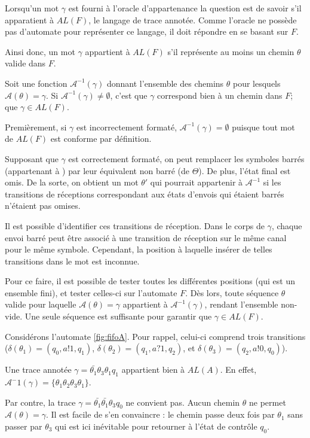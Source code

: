 Lorsqu'un mot $\gamma$ est fourni à l'oracle d'appartenance la question est de savoir s'il apparatient à $AL(F)$, le langage de trace annotée. Comme l'oracle ne possède pas d'automate pour représenter ce langage, il doit répondre en se basant sur $F$.

Ainsi donc, un mot $\gamma$ appartient à $AL(F)$ s'il représente au moins un chemin $\theta$ valide dans $F$.

Soit une fonction $\mathcal{A}^{-1}(\gamma)$ donnant l'ensemble des chemins $\theta$ pour lesquels $\mathcal{A}(\theta)=\gamma$. Si $\mathcal{A}^{-1}(\gamma)\neq\emptyset$, c'est que $\gamma$ correspond bien à un chemin dans $F$; que $\gamma\in AL(F)$.

Premièrement, si $\gamma$ est incorrectement formaté, $\mathcal{A^{-1}}(\gamma)=\emptyset$ puisque tout mot de $AL(F)$ est conforme par définition.

Supposant que $\gamma$ est correctement formaté, on peut remplacer les symboles barrés (appartenant à \barTheta) par leur équivalent non barré (de $\Theta$). De plus, l'état final est omis. De la sorte, on obtient un mot $\theta'$ qui pourrait appartenir à $\mathcal{A}^{-1}$ si les transitions de réceptions correspondant aux états d'envois qui étaient barrés n'étaient pas omises.

Il est possible d'identifier ces transitions de réception. Dans le corps de $\gamma$, chaque envoi barré peut être associé à une transition de réception sur le même canal pour le même symbole. Cependant, la position à laquelle insérer de telles transitions dans le mot est inconnue.

Pour ce faire, il est possible de tester toutes les différentes positions (qui est un ensemble fini), et tester celles-ci sur l'automate $F$. Dès lors, toute séquence $\theta$ valide pour laquelle $\mathcal{A}(\theta)=\gamma$ appartient à $\mathcal{A}^{-1}(\gamma)$, rendant l'ensemble non-vide. Une seule séquence est suffisante pour garantir que $\gamma\in AL(F)$.

\begin{example}
Considérons l'automate \ref{fig:fifoA}. Pour rappel, celui-ci comprend trois transitions ($\delta(\theta_1)=(q_0, a!1, q_1)$, $\delta(\theta_2)=(q_1,a?1,q_2)$, et $\delta(\theta_3)=(q_2, a!0, q_0)$).

Une trace annotée $\gamma=\bar{\theta_1}\theta_3\theta_1q_1$ appartient bien à $AL(A)$. En effet, $\mathcal{A}^-1(\gamma)=\{\theta_1\theta_2\theta_3\theta_1\}$.

Par contre, la trace $\gamma=\bar{\theta_1}\bar{\theta_1}\theta_3q_0$ ne convient pas. Aucun chemin $\theta$ ne permet $\mathcal{A}(\theta)=\gamma$. Il est facile de s'en convaincre : le chemin passe deux fois par $\theta_1$ sans passer par $\theta_3$ qui est ici inévitable pour retourner à l'état de contrôle $q_0$.
\end{example}


